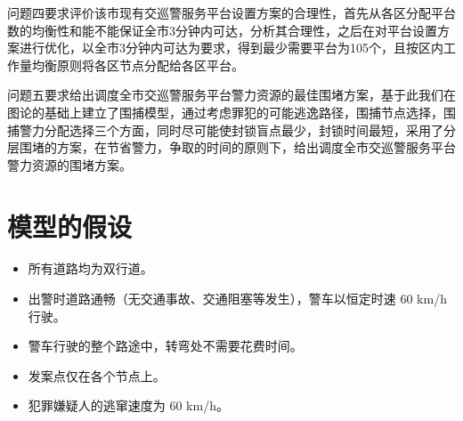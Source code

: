 \documentclass{cumcmthesis}
\begin{document}
  问题四要求评价该市现有交巡警服务平台设置方案的合理性，首先从各区分配平台数的均衡性和能不能保证全市3分钟内可达，分析其合理性，之后在对平台设置方案进行优化，以全市3分钟内可达为要求，得到最少需要平台为105个，且按区内工作量均衡原则将各区节点分配给各区平台。

  问题五要求给出调度全市交巡警服务平台警力资源的最佳围堵方案，基于此我们在图论的基础上建立了围捕模型，通过考虑罪犯的可能逃逸路径，围捕节点选择，围捕警力分配选择三个方面，同时尽可能使封锁盲点最少，封锁时间最短，采用了分层围堵的方案，在节省警力，争取的时间的原则下，给出调度全市交巡警服务平台警力资源的围堵方案。


\section{模型的假设}
  \begin{itemize}
    \item 所有道路均为双行道。
    \item 出警时道路通畅（无交通事故、交通阻塞等发生），警车以恒定时速 60 km/h 行驶。
    \item 警车行驶的整个路途中，转弯处不需要花费时间。
    \item 发案点仅在各个节点上。
    \item 犯罪嫌疑人的逃窜速度为 60 km/h。
  \end{itemize}
\end{document}
